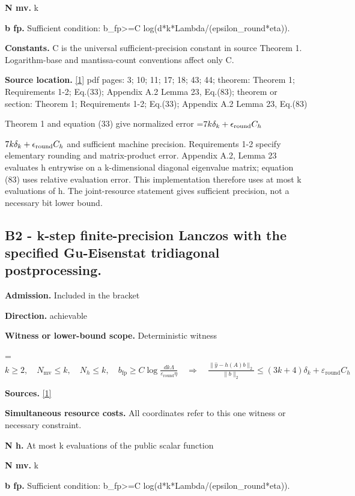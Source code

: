 \documentclass[10pt,a4paper]{article}
\newcommand{\AtlasMath}[1]{\par\begingroup\centering\setbox0=\hbox{$\displaystyle #1$}\ifdim\wd0>1.4\linewidth\typeout{ATLAS WIDE FORMULA: \the\wd0}\fi\ifdim\wd0>\linewidth\resizebox{\linewidth}{!}{\box0}\else\box0\fi\par\endgroup}
\newcommand{\AtlasInlineMath}[1]{\begingroup\setbox0=\hbox{$#1$}\ifdim\wd0>.4\linewidth\endgroup\AtlasMath{#1}\else\endgroup$#1$\fi}
\begin{document}
\textbf{N mv.} k

\textbf{b fp.} Sufficient condition: b\_\allowbreak{}fp>=C log(d*k*Lambda/(epsilon\_\allowbreak{}round*eta)).

\textbf{Constants.} C is the universal sufficient-precision constant in source Theorem 1. Logarithm-base and mantissa-count conventions affect only C.

\textbf{Source location.} \href{https://arxiv.org/pdf/1708.07788v2}{[1]} pdf pages: 3; 10; 11; 17; 18; 43; 44; theorem: Theorem 1; Requirements 1-2; Eq.(33); Appendix A.2 Lemma 23, Eq.(83); theorem or section: Theorem 1; Requirements 1-2; Eq.(33); Appendix A.2 Lemma 23, Eq.(83)

Theorem 1 and equation (33) give normalized error \AtlasInlineMath{7k\delta_k+\epsilon_{\rm round}C_h} and sufficient machine precision. Requirements 1-2 specify elementary rounding and matrix-product error. Appendix A.2, Lemma 23 evaluates h entrywise on a k-dimensional diagonal eigenvalue matrix; equation (83) uses relative evaluation error. This implementation therefore uses at most k evaluations of h. The joint-resource statement gives sufficient precision, not a necessary bit lower bound.

\subsection{B2 - k-step finite-precision Lanczos with the specified Gu-Eisenstat tridiagonal postprocessing.}
\textbf{Admission.} Included in the bracket

\textbf{Direction.} achievable

\textbf{Witness or lower-bound scope.} Deterministic witness

\AtlasMath{k\ge 2,\quad N_{\mathrm{mv}}\le k,\quad N_h\le k,\quad b_{\mathrm{fp}}\ge C\log\frac{dk\Lambda}{\varepsilon_{\mathrm{round}}\eta}\quad\Longrightarrow\quad \frac{\|\widehat y-h(A)b\|_2}{\|b\|_2}\le(3k+4)\delta_k+\varepsilon_{\mathrm{round}}C_h}
\textbf{Sources.} \href{https://arxiv.org/pdf/1708.07788v2}{[1]}

\textbf{Simultaneous resource costs.} All coordinates refer to this one witness or necessary constraint.

\textbf{N h.} At most k evaluations of the public scalar function

\textbf{N mv.} k

\textbf{b fp.} Sufficient condition: b\_\allowbreak{}fp>=C log(d*k*Lambda/(epsilon\_\allowbreak{}round*eta)).
\end{document}
